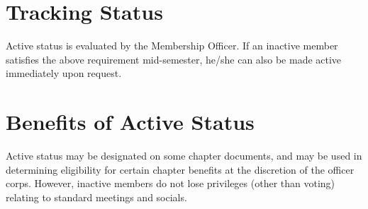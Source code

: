 \section{Tracking Status}  Active status is evaluated by the Membership Officer.  If an inactive member satisfies the above requirement mid-semester, he/she can also be made active immediately upon request.  

\section{Benefits of Active Status}  Active status may be designated on some chapter documents, and may be used in determining eligibility for certain chapter benefits at the discretion of the officer corps.  However, inactive members do not lose privileges (other than voting) relating to standard meetings and socials.